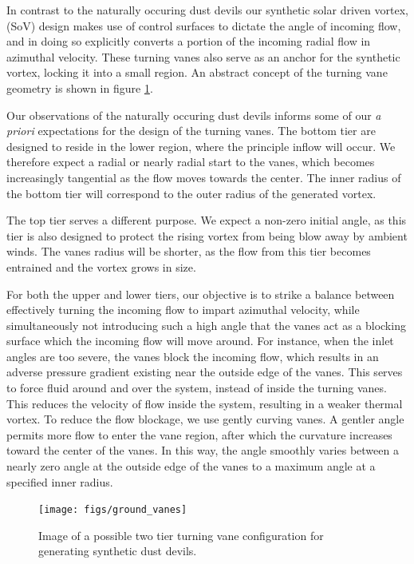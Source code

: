 In contrast to the naturally occuring dust devils
our synthetic solar driven vortex, (SoV) design makes use of
control surfaces to dictate the angle of incoming flow, and in doing so
explicitly converts a portion of the incoming radial flow in azimuthal
velocity. These turning vanes also serve as an anchor for the synthetic
vortex, locking it into a small region. An abstract concept of the turning
vane geometry is shown in figure \ref{fig:cartoon_vanes}.

Our observations of the naturally occuring dust devils informs some of
our \textit{a priori} expectations for the design of the turning
vanes. The bottom tier are designed to reside in the lower region, where
the principle inflow will occur. We therefore expect a radial or nearly
radial start to the vanes, which becomes increasingly tangential as the
flow moves towards the center. The inner radius of the bottom tier will
correspond to the outer radius of the generated vortex. 

The top tier serves a different purpose. We expect a non-zero initial
angle, as this tier is also designed to protect the rising vortex from
being blow away by ambient winds. The vanes radius will be shorter, as
the flow from this tier becomes entrained and the vortex grows in
size. 

For both the upper and lower tiers, our objective is to strike a balance
between effectively turning the incoming flow to impart azimuthal
velocity, while simultaneously not introducing such a high angle that
the vanes act as a blocking surface which the incoming flow will move
around. For instance, when the inlet angles are too severe, the vanes
block the incoming flow, which results in an adverse pressure gradient
existing near the outside edge of the 
vanes. This serves to force fluid around and over the system, instead
of inside the turning vanes. This reduces the velocity of flow inside
the system, resulting in a weaker thermal vortex.  To reduce
the flow blockage, we use gently curving vanes. A gentler angle permits
more flow to enter the vane region, after which the curvature increases
toward the center of the vanes. In this way, the angle smoothly varies
between a nearly zero angle at the outside edge of the vanes to a
maximum angle at a specified inner radius.

  \begin{figure}[!htb]
    \begin{center}
     \texttt{[image: figs/ground\_vanes]}
     \caption{Image of a possible two tier turning vane 
       configuration for generating synthetic dust devils.}
     \label{fig:cartoon_vanes}
    \end{center}
  \end{figure}

